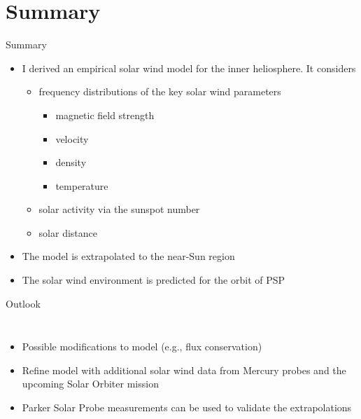 \section{Summary}

\begin{frame}[c]{Summary}{}
	
	\begin{itemize}%
		\item I derived an empirical solar wind model for the inner heliosphere. It considers
		\begin{itemize}
			\item frequency distributions of the key solar wind parameters
			\begin{itemize}
				\item magnetic field strength
				\item velocity
				\item density
				\item temperature
			\end{itemize}
			\item solar activity via the sunspot number
			\item solar distance
		\end{itemize}
		\item The model is extrapolated to the near-Sun region
		\item The solar wind environment is predicted for the orbit of PSP
	\end{itemize}
	
\end{frame}

{
\begin{frame}[plain,t]{Outlook}{}
	\begin{columns}[c]
		
		\begin{itemize}
			\item Possible modifications to model (e.g., flux conservation)
			\item Refine model with additional solar wind data from Mercury probes and the upcoming Solar Orbiter mission
			\item Parker Solar Probe measurements can be used to validate the extrapolations
		\end{itemize}
		
		\vspace{2cm}
		
		
		
		
	\end{columns}
\end{frame}
}

